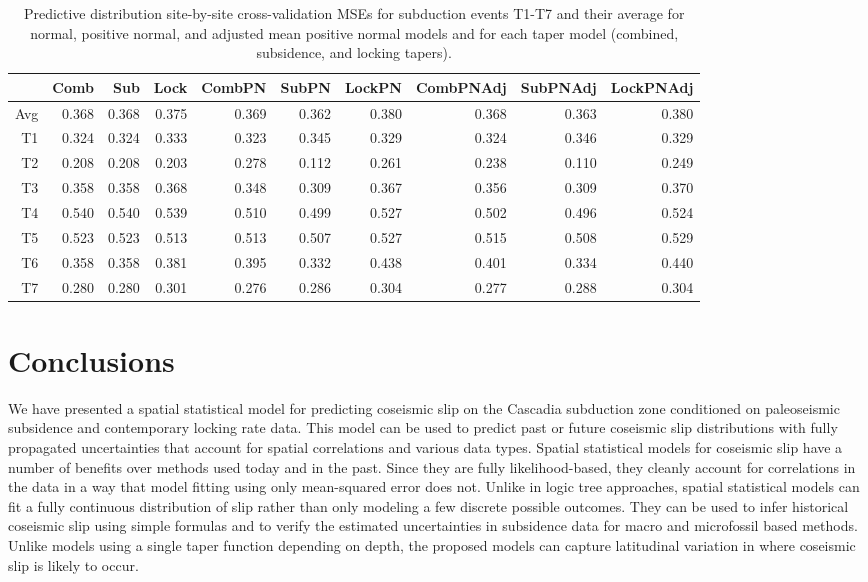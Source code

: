 {\begin{table}[ht]
\centering
\begin{tabular}{rrrrrrrrrr}
  \hline
 & Comb & Sub & Lock & CombPN & SubPN & LockPN & CombPNAdj & SubPNAdj & LockPNAdj \\ 
  \hline
    Avg & 0.368 & 0.368 & 0.375 & 0.369 & 0.362 & 0.380 & 0.368 & 0.363 & 0.380 \\ 
T1 & 0.324 & 0.324 & 0.333 & 0.323 & 0.345 & 0.329 & 0.324 & 0.346 & 0.329 \\ 
  T2 & 0.208 & 0.208 & 0.203 & 0.278 & 0.112 & 0.261 & 0.238 & 0.110 & 0.249 \\ 
  T3 & 0.358 & 0.358 & 0.368 & 0.348 & 0.309 & 0.367 & 0.356 & 0.309 & 0.370 \\ 
  T4 & 0.540 & 0.540 & 0.539 & 0.510 & 0.499 & 0.527 & 0.502 & 0.496 & 0.524 \\ 
  T5 & 0.523 & 0.523 & 0.513 & 0.513 & 0.507 & 0.527 & 0.515 & 0.508 & 0.529 \\ 
  T6 & 0.358 & 0.358 & 0.381 & 0.395 & 0.332 & 0.438 & 0.401 & 0.334 & 0.440 \\ 
  T7 & 0.280 & 0.280 & 0.301 & 0.276 & 0.286 & 0.304 & 0.277 & 0.288 & 0.304 \\ 
   \hline
\end{tabular}
\caption{Predictive distribution site-by-site cross-validation MSEs for subduction events T1-T7 and their average for normal, positive normal, and adjusted mean positive normal models and for each taper model (combined, subsidence, and locking tapers).}
\label{predMSE}
\end{table}

\FloatBarrier
\section{Conclusions}
\label{conclusions}
We have presented a spatial statistical model for predicting coseismic slip on the Cascadia subduction zone conditioned on paleoseismic subsidence and contemporary locking rate data.  This model can be used to predict past or future coseismic slip distributions with fully propagated uncertainties that account for spatial correlations and various data types.  Spatial statistical models for coseismic slip have a number of benefits over methods used today and in the past.  Since they are fully likelihood-based, they cleanly account for correlations in the data in a way that model fitting using only mean-squared error does not.  Unlike in logic tree approaches, spatial statistical models can fit a fully continuous distribution of slip rather than only modeling a few discrete possible outcomes.  They can be used to infer historical coseismic slip using simple formulas and to verify the estimated uncertainties in subsidence data for macro and microfossil based methods.  Unlike models using a single taper function depending on depth, the proposed models can capture latitudinal variation in where coseismic slip is likely to occur.

}
